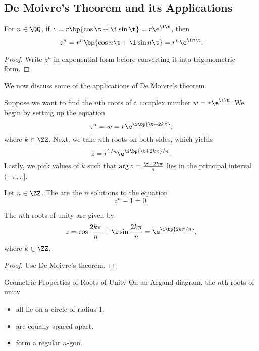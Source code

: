 \subsection{De Moivre's Theorem and its Applications}

\begin{theorem}
    For $n \in \QQ$, if $z = r\bp{\cos \t + \i \sin \t} = r \e^{\i \t}$, then \[z^n = r^n \bp{\cos n\t + \i \sin n\t} = r^n \e^{\i n \t}.\]
\end{theorem}
\begin{proof}
    Write $z^n$ in exponential form before converting it into trigonometric form.
\end{proof}

We now discuss some of the applications of De Moivre's theorem.

\begin{method}
    Suppose we want to find the $n$th roots of a complex number $w = r \e^{\i \t}$. We begin by setting up the equation \[z^n = w = r \e^{\i \bp{\t + 2k\pi}},\] where $k \in \ZZ$. Next, we take $n$th roots on both sides, which yields \[z = r^{1/n} \e^{\i \bp{\t + 2k\pi} /n}.\] Lastly, we pick values of $k$ such that $\arg z = \frac{\t + 2k\pi}{n}$ lies in the principal interval $(-\pi, \pi]$.
\end{method}

\begin{definition}
    Let $n \in \ZZ$. The  are the $n$ solutions to the equation \[z^n - 1 = 0.\]
\end{definition}

\begin{proposition}
    The $n$th roots of unity are given by \[z = \cos \frac{2k \pi}{n} + \i \sin \frac{2k \pi}{n} = \e^{\i \bp{2k \pi / n}},\] where $k \in \ZZ$.
\end{proposition}
\begin{proof}
    Use De Moivre's theorem.
\end{proof}

\begin{fact}{Geometric Properties of Roots of Unity}
    On an Argand diagram, the $n$th roots of unity
    \begin{itemize}
        \item all lie on a circle of radius 1.
        \item are equally spaced apart.
        \item form a regular $n$-gon.
    \end{itemize}
\end{fact}

